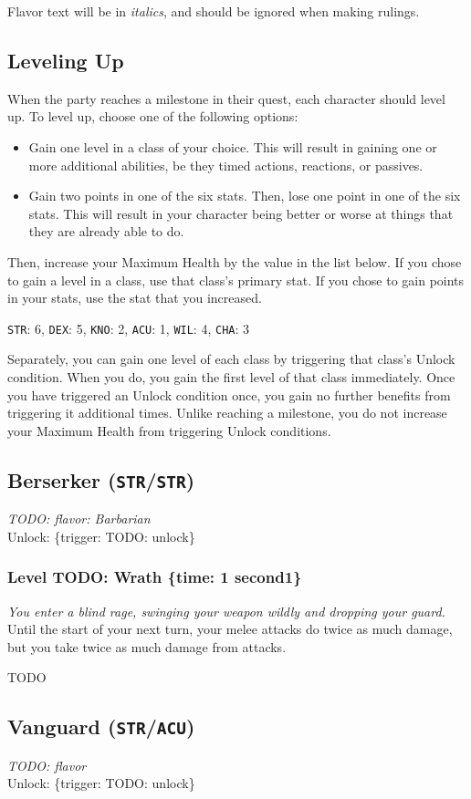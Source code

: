 \documentclass[12pt]{article}
\newcommand{\STR}{\texttt{STR}}
\newcommand{\DEX}{\texttt{DEX}}
\newcommand{\KNO}{\texttt{KNO}}
\newcommand{\ACU}{\texttt{ACU}}
\newcommand{\WIL}{\texttt{WIL}}
\newcommand{\CHA}{\texttt{CHA}}
\newcommand{\TIME}[1]{\{time: #1 second\if1#1{}\else{s}\fi\}}
\newcommand{\TRIG}[1]{\{trigger: #1\}}
\newcommand{\Class}[4]{\pagebreak\subsection{#1 (#2)}\label{#1}\textit{#3}\\[1mm]Unlock: \TRIG{#4}}
\newcommand{\Skill}[5]{\subsubsection{Level #1: #2 #3}\textit{#4}\\[1mm]#5}
\begin{document}
Flavor text will be in \textit{italics}, and should be ignored when making rulings.

\subsection{Leveling Up}

When the party reaches a milestone in their quest, each character should level up. To level up, choose one of the following options:
\begin{itemize}
\item Gain one level in a class of your choice. This will result in gaining one or more additional abilities, be they timed actions, reactions, or passives.
\item Gain two points in one of the six stats. Then, lose one point in one of the six stats. This will result in your character being better or worse at things that they are already able to do.
\end{itemize}

Then, increase your Maximum Health by the value in the list below. If you chose to gain a level in a class, use that class's primary stat. If you chose to gain points in your stats, use the stat that you increased.
\begin{center}
\STR: 6, \DEX: 5, \KNO: 2, \ACU: 1, \WIL: 4, \CHA: 3
\end{center}

Separately, you can gain one level of each class by triggering that class's Unlock condition. When you do, you gain the first level of that class immediately. Once you have triggered an Unlock condition once, you gain no further benefits from triggering it additional times. Unlike reaching a milestone, you do not increase your Maximum Health from triggering Unlock conditions.

%

\Class{Berserker}{\STR/\STR}
{TODO: flavor: Barbarian}
{TODO: unlock}

\Skill{TODO}{Wrath}{\TIME{1}}
{You enter a blind rage, swinging your weapon wildly and dropping your guard.}
{Until the start of your next turn, your melee attacks do twice as much damage, but you take twice as much damage from attacks.}

TODO

%

%

%

\Class{Vanguard}{\STR/\ACU}
{TODO: flavor}
{TODO: unlock}
\end{document}
